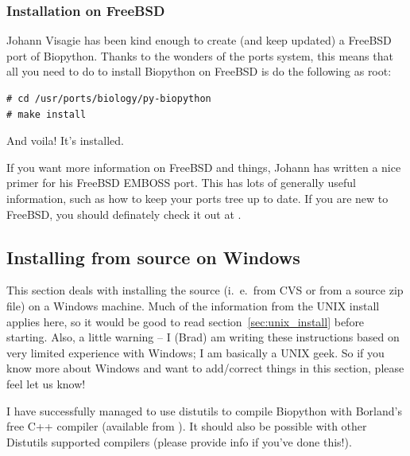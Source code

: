 \documentclass{report}
\begin{document}
\subsubsection{Installation on FreeBSD}

Johann Visagie has been kind enough to create (and keep updated) a FreeBSD port of Biopython. Thanks to the wonders of the ports system, this means that all you need to do to install Biopython on FreeBSD is do the following as root:

\begin{verbatim}
# cd /usr/ports/biology/py-biopython
# make install
\end{verbatim}

And voila! It's installed. 


If you want more information on FreeBSD and things, Johann has written a nice primer for his FreeBSD EMBOSS port. This has lots of generally useful information, such as how to keep your ports tree up to date. If you are new to FreeBSD, you should definately check it out at .

\subsection{Installing from source on Windows}
\label{sec:windows_install}

This section deals with installing the source (i.~e.~from CVS or from a source zip file) on a Windows machine. Much of the information from the UNIX install applies here, so it would be good to read section~\ref{sec:unix_install} before starting. Also, a little warning -- I (Brad) am writing these instructions based on very limited experience with Windows; I am basically a UNIX geek. So if you know more about Windows and want to add/correct things in this section, please feel let us know!


I have successfully managed to use distutils to compile Biopython with Borland's free C++ compiler (available from ). It should also be possible with other Distutils supported compilers (please provide info if you've done this!).
\end{document}
